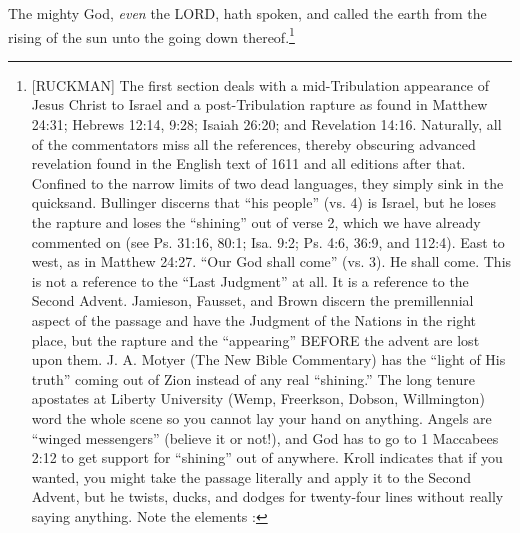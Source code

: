 \textcolor[rgb]{0.00,0.00,1.00}{The mighty God, \emph{even} the LORD, hath spoken, and called the earth from the rising of the sun unto the going down thereof.}\footnote{[RUCKMAN] The first section deals with a mid-Tribulation appearance of Jesus Christ to Israel and a post-Tribulation rapture as found in Matthew 24:31; Hebrews 12:14, 9:28; Isaiah 26:20; and Revelation 14:16. Naturally, all of the commentators miss all the references, thereby obscuring advanced revelation found in the English text of 1611 and all editions after that. Confined to the narrow limits of two dead languages, they simply sink in the quicksand. Bullinger discerns that “his people” (vs. 4) is Israel, but he loses the rapture and loses the ``shining'' out of verse 2, which we have already commented on (see Ps. 31:16, 80:1; Isa. 9:2; Ps. 4:6, 36:9, and 112:4). East to west, as in Matthew 24:27. “Our God shall come” (vs. 3). He shall come. This is not a reference to the “Last Judgment” at all. It is a reference to the Second Advent. Jamieson, Fausset, and Brown discern the premillennial aspect of the passage and have the Judgment of the Nations in the right place, but the rapture and the “appearing” BEFORE the advent are lost upon them. J. A. Motyer (The New Bible Commentary) has the “light of His truth” coming out of Zion instead of any real “shining.” The long tenure apostates at Liberty University (Wemp, Freerkson, Dobson, Willmington) word the whole scene so you cannot lay your hand on anything. Angels are “winged messengers” (believe it or not!), and God has to go to 1 Maccabees 2:12 to get support for “shining” out of anywhere. Kroll indicates that if you wanted, you might take the passage literally and apply it to the Second Advent, but he twists, ducks, and dodges for twenty-four lines without really saying anything. Note the elements \cite{Ruckman1992Psalms}:
}

